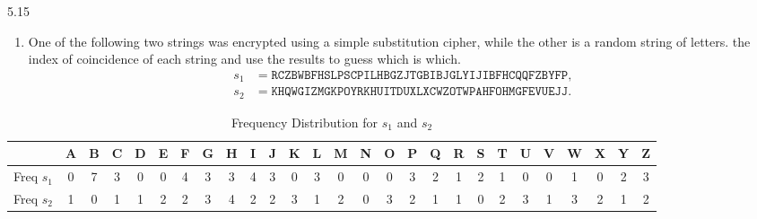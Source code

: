 \begin{exercise}
    {5.15}
    \begin{enumerate}
        \item One of the following two strings was encrypted using a simple substitution cipher, while the other is a random string of letters. the index of coincidence of each string and use the results to guess which is which.
              \begin{align*}
                  s_{1} & = \texttt{RCZBWBFHSLPSCPILHBGZJTGBIBJGLYIJIBFHCQQFZBYFP}, \\
                  s_{2} & = \texttt{KHQWGIZMGKPOYRKHUITDUXLXCWZOTWPAHFOHMGFEVUEJJ}.
              \end{align*}
    \end{enumerate}
\end{exercise}

\begin{table}[htbp]
    \centering
    \setlength{\tabcolsep}{4pt}
    \begin{tabular}{@{}ccccccccccccccccccccccccccc@{}}
        \toprule
                       & A & B & C & D & E & F & G & H & I & J & K & L & M & N & O & P & Q & R & S & T & U & V & W & X & Y & Z \\ \midrule
        Freq \(s_{1}\) & 0 & 7 & 3 & 0 & 0 & 4 & 3 & 3 & 4 & 3 & 0 & 3 & 0 & 0 & 0 & 3 & 2 & 1 & 2 & 1 & 0 & 0 & 1 & 0 & 2 & 3 \\ \midrule
        Freq \(s_{2}\) & 1 & 0 & 1 & 1 & 2 & 2 & 3 & 4 & 2 & 2 & 3 & 1 & 2 & 0 & 3 & 2 & 1 & 1 & 0 & 2 & 3 & 1 & 3 & 2 & 1 & 2 \\
        \bottomrule
    \end{tabular}
    \caption{Frequency Distribution for \(s_{1}\) and \(s_{2}\) }\label{tab:5.2}
\end{table}





